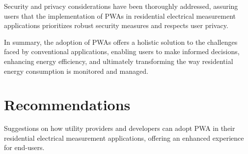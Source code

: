 \documentclass{article}
\begin{document}
\begin{multicols}{2}
\vspace{0,5cm}

Security and privacy considerations have been thoroughly addressed, assuring users that the implementation of PWAs in residential electrical measurement applications prioritizes robust security measures and respects user privacy.

\vspace{0,5cm}

In summary, the adoption of PWAs offers a holistic solution to the challenges faced by conventional applications, enabling users to make informed decisions, enhancing energy efficiency, and ultimately transforming the way residential energy consumption is monitored and managed.
\section*{Recommendations}
Suggestions on how utility providers and developers can adopt PWA in their residential electrical measurement applications, offering an enhanced experience for end-users.

     
\end{multicols}  %
\end{document}
